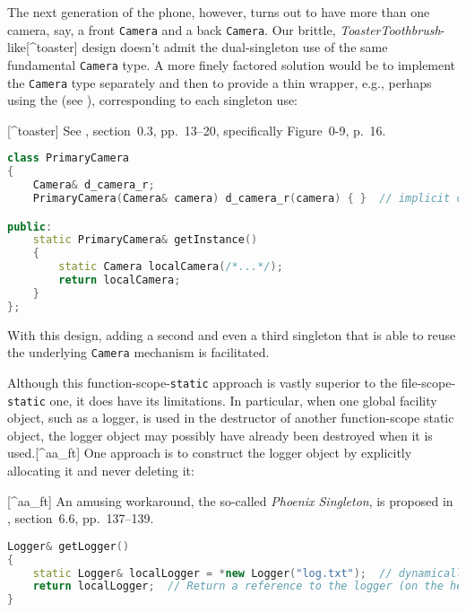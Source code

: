 The next generation of the phone, however, turns out to have more than
one camera, say, a front \lstinline!Camera! and a back \lstinline!Camera!. Our
brittle, \emph{ToasterToothbrush}-like{[}\^{}toaster{]} design doesn't
admit the dual-singleton use of the same fundamental \lstinline!Camera!
type. A more finely factored solution would be to implement the
\lstinline!Camera! type separately and then to provide a thin wrapper,
e.g., perhaps using the  (see
{}), corresponding to each singleton
use:

{[}\^{}toaster{]} See \cite{lakos20}, section~0.3, pp.~13--20, specifically
Figure~0-9, p.~16.

\begin{lstlisting}[language=C++]
class PrimaryCamera
{
    Camera& d_camera_r;
    PrimaryCamera(Camera& camera) d_camera_r(camera) { }  // implicit constructor

public:
    static PrimaryCamera& getInstance()
    {
        static Camera localCamera(/*...*/);
        return localCamera;
    }
};
\end{lstlisting}
    
\noindent With this design, adding a second and even a third singleton that is
able to reuse the underlying \lstinline!Camera! mechanism is facilitated.

Although this function-scope-\lstinline!static! approach is vastly superior
to the file-scope-\lstinline!static! one, it does have its limitations. In
particular, when one global facility object, such as a logger, is used
in the destructor of another function-scope static object, the logger
object may possibly have already been destroyed when it is
used.{[}\^{}aa\_ft{]} One approach is to construct the logger object by
explicitly allocating it and never deleting it:

{[}\^{}aa\_ft{]} An amusing workaround, the so-called \emph{Phoenix
Singleton}, is proposed in \cite{alexandrescu01}, section~6.6, pp.~137--139.

\begin{lstlisting}[language=C++]
Logger& getLogger()
{
    static Logger& localLogger = *new Logger("log.txt");  // dynamically allocated
    return localLogger;  // Return a reference to the logger (on the heap).
}
\end{lstlisting}
    
